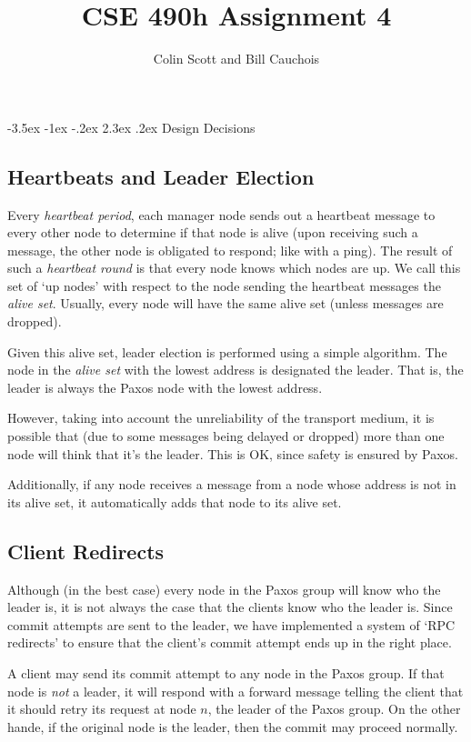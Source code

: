 \documentclass[12pt]{article}
\title{CSE 490h Assignment 4}
\author{
Colin Scott and Bill Cauchois \\
}
\makeatletter
\renewcommand\section{\@startsection{section}{1}{\z@}%
								 {-3.5ex \@plus -1ex \@minus -.2ex}%
								 {2.3ex \@plus.2ex}%
								 {\normalfont\large\bfseries}}
\makeatother
\begin{document}
\maketitle

\section{Design Decisions}

\subsection{Heartbeats and Leader Election}

Every \emph{heartbeat period}, each manager node sends out a heartbeat message to every other
node to determine if that node is alive (upon receiving such a message, the other node is
obligated to respond; like with a ping). The result of such a \emph{heartbeat round} is that
every node knows which nodes are up. We call this set of `up nodes' with respect to the node
sending the heartbeat messages the \emph{alive set}. Usually, every node will have the same
alive set (unless messages are dropped).

Given this alive set, leader election is performed using a simple algorithm. The node in the
\emph{alive set} with the lowest address is designated the leader. That is, the leader is always
the Paxos node with the lowest address.

However, taking into account the unreliability of the transport medium, it is possible that
(due to some messages being delayed or dropped) more than one node will think that it's the
leader. This is OK, since safety is ensured by Paxos.

Additionally, if any node receives a message from a node whose address is not in its alive set,
it automatically adds that node to its alive set.

\subsection{Client Redirects}

Although (in the best case) every node in the Paxos group will know who the leader is, it is not
always the case that the clients know who the leader is. Since commit attempts are sent to the leader,
we have implemented a system of `RPC redirects' to ensure that the client's commit attempt ends up in the right place.

A client may send its commit attempt to any node in the Paxos group. If that node is \emph{not} a leader,
it will respond with a forward message telling the client that it should retry its request at node $n$,
the leader of the Paxos group. On the other hande, if the original node is the leader, then the commit may
proceed normally.
\end{document}
